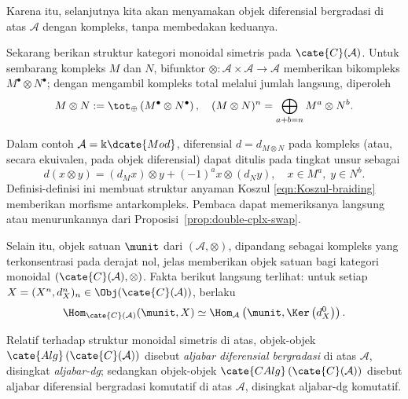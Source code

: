 Karena itu, selanjutnya kita akan menyamakan objek diferensial bergradasi di
atas $\mathcal{A}$ dengan kompleks, tanpa membedakan keduanya.

Sekarang berikan struktur kategori monoidal simetris pada
$\cate{C}(\mathcal{A})$. Untuk sembarang kompleks $M$ dan $N$, bifunktor
$\otimes:\mathcal{A}\times\mathcal{A}\to\mathcal{A}$ memberikan bikompleks
$M^\bullet\otimes N^\bullet$; dengan mengambil kompleks total melalui jumlah
langsung, diperoleh
\[ M \otimes N := \tot_{\oplus}\left( M^\bullet \otimes N^\bullet \right), \quad (M \otimes N)^n = \bigoplus_{a+b=n} M^a \otimes N^b. \]

Dalam contoh $\mathcal{A}=\Bbbk\dcate{Mod}$, diferensial
$d=d_{M\otimes N}$ pada kompleks (atau, secara ekuivalen, pada objek
diferensial) dapat ditulis pada tingkat unsur sebagai
\begin{equation*}
	d(x \otimes y) = (d_M x) \otimes y + (-1)^a x \otimes (d_N y), \quad x \in M^a, \; y \in N^b.
\end{equation*}
Definisi-definisi ini membuat struktur anyaman Koszul
\eqref{eqn:Koszul-braiding} memberikan morfisme antarkompleks. Pembaca dapat
memeriksanya langsung atau menurunkannya dari
Proposisi~\ref{prop:double-cplx-swap}.

Selain itu, objek satuan $\munit$ dari $(\mathcal{A},\otimes)$, dipandang
sebagai kompleks yang terkonsentrasi pada derajat nol, jelas memberikan objek
satuan bagi kategori monoidal $(\cate{C}(\mathcal{A}),\otimes)$. Fakta berikut
langsung terlihat: untuk setiap
$X=(X^n,d_X^n)_n\in\Obj(\cate{C}(\mathcal{A}))$, berlaku
\begin{equation}\label{eqn:unit-map-into-cplx}
	\Hom_{\cate{C}(\mathcal{A})}(\munit, X) \simeq \Hom_{\mathcal{A}}\left( \munit, \Ker\left(d_X^0 \right) \right).
\end{equation}

\begin{definition}\label{def:dg-algebra}
	Relatif terhadap struktur monoidal simetris di atas, objek-objek
	$\cate{Alg}\left(\cate{C}(\mathcal{A})\right)$ disebut
	\emph{aljabar diferensial bergradasi} di atas $\mathcal{A}$, disingkat
	\emph{aljabar-dg}; sedangkan objek-objek
	$\cate{CAlg}\left(\cate{C}(\mathcal{A})\right)$ disebut aljabar diferensial
	bergradasi komutatif di atas $\mathcal{A}$, disingkat aljabar-dg komutatif.
\end{definition}

